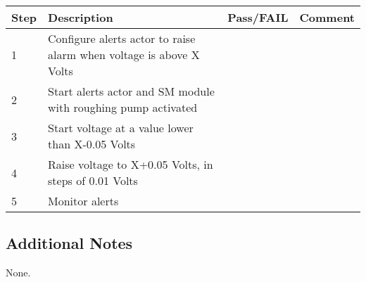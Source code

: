 \begin{table}[H]
    \begin{tabular}{|l| p{5cm} |l| p{5cm} |}
    \hline
    {\bf Step} & {\bf Description} & {\bf Pass/FAIL} & {\bf Comment}  \\ \hline
    1 & Configure alerts actor to raise alarm when voltage is above X Volts &  &  \\ \hline
    2 & Start alerts actor and SM module with roughing pump activated &  & \\ \hline
    3 & Start voltage at a value lower than X-0.05 Volts &  & \\ \hline
    4 & Raise voltage to X+0.05 Volts, in steps of 0.01 Volts &  & \\ \hline
    5 & Monitor alerts &  & \\ \hline
    \end{tabular}
\end{table}


\subsection{Additional Notes}

None.
